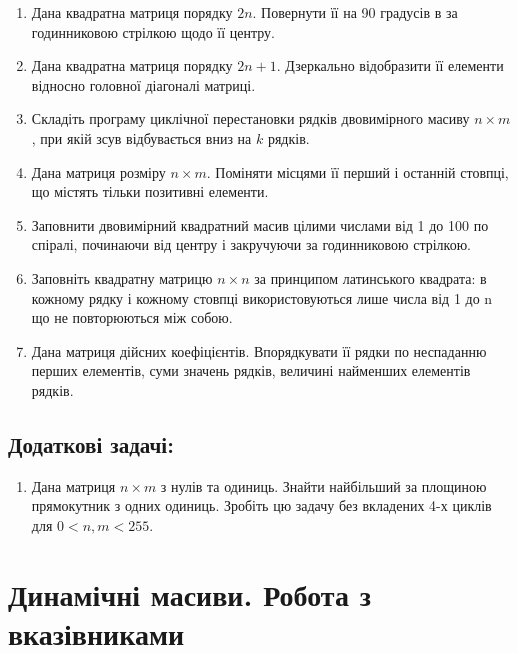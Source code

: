 \documentclass[a5paper,titlepage,openany,twoside,draft]{book_unv}%
\begin{document}
\begin{enumerate}
\item
  Дана квадратна матриця порядку $2n$. Повернути її на 90 градусів в
  за годинниковою стрілкою щодо її центру.
\item
  Дана квадратна матриця порядку $2n + 1$. Дзеркально відобразити її
  елементи відносно головної діагоналі матриці.
\item
  Складіть програму циклічної перестановки рядків двовимірного масиву $n \times m$,
  при якій зсув відбувається вниз на $k$ рядків.
\item
  Дана матриця розміру $n \times m$. Поміняти місцями її перший і останній
  стовпці, що містять тільки позитивні елементи.
\item
  Заповнити двовимірний квадратний масив цілими числами від 1 до 100 по
  спіралі, починаючи від центру і закручуючи за годинниковою стрілкою.
\item
  Заповніть квадратну матрицю $n \times n$ за принципом латинського квадрата: в
  кожному рядку і кожному стовпці використовуються лише числа від 1 до n
  що не повторюються між собою.
\item
  Дана матриця дійсних коефіцієнтів. Впорядкувати її рядки по неспаданню
  перших елементів, суми значень рядків, величині найменших елементів
  рядків.
\end{enumerate}

\section{Додаткові задачі:}

\begin{enumerate}
\def\labelenumi{\arabic{enumi})}
\setcounter{enumi}{32}
\item
  Дана матриця $n \times m$ з нулів та одиниць. Знайти найбільший за площиною
  прямокутник з одних одиниць. Зробіть цю задачу без вкладених 4-х
  циклів для $0<n,m<255$.
\end{enumerate}


\chapter{Динамічні масиви. Робота з вказівниками }
%
\end{document}
